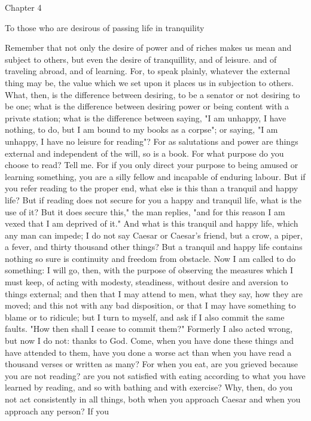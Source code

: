 \documentclass[a4paper]{article}
\begin{document}
Chapter 4

To those who are desirous of passing life in tranquility

    Remember that not only the desire of power and of riches makes us mean and
subject to others, but even the desire of tranquillity, and of leisure. and of
traveling abroad, and of learning. For, to speak plainly, whatever the external
thing may be, the value which we set upon it places us in subjection to others.
What, then, is the difference between desiring, to be a senator or not desiring
to be one; what is the difference between desiring power or being content with
a private station; what is the difference between saying, "I am unhappy, I have
nothing, to do, but I am bound to my books as a corpse"; or saying, "I am
unhappy, I have no leisure for reading"? For as salutations and power are
things external and independent of the will, so is a book. For what purpose do
you choose to read? Tell me. For if you only direct your purpose to being
amused or learning something, you are a silly fellow and incapable of enduring
labour. But if you refer reading to the proper end, what else is this than a
tranquil and happy life? But if reading does not secure for you a happy and
tranquil life, what is the use of it? But it does secure this," the man
replies, "and for this reason I am vexed that I am deprived of it." And what is
this tranquil and happy life, which any man can impede; I do not say Caesar or
Caesar's friend, but a crow, a piper, a fever, and thirty thousand other
things? But a tranquil and happy life contains nothing so sure is continuity
and freedom from obstacle. Now I am called to do something: I will go, then,
with the purpose of observing the measures which I must keep, of acting with
modesty, steadiness, without desire and aversion to things external; and then
that I may attend to men, what they say, how they are moved; and this not with
any bad disposition, or that I may have something to blame or to ridicule; but
I turn to myself, and ask if I also commit the same faults. "How then shall I
cease to commit them?" Formerly I also acted wrong, but now I do not: thanks to
God.
    Come, when you have done these things and have attended to them, have you
done a worse act than when you have read a thousand verses or written as many?
For when you eat, are you grieved because you are not reading? are you not
satisfied with eating according to what you have learned by reading, and so
with bathing and with exercise? Why, then, do you not act consistently in all
things, both when you approach Caesar and when you approach any person? If you
\end{document}
